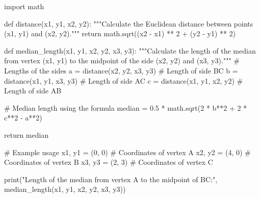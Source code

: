 import math

def distance(x1, y1, x2, y2):
    """Calculate the Euclidean distance between points (x1, y1) and (x2, y2)."""
    return math.sqrt((x2 - x1) ** 2 + (y2 - y1) ** 2)

def median_length(x1, y1, x2, y2, x3, y3):
    """Calculate the length of the median from vertex (x1, y1) to the midpoint of the side (x2, y2) and (x3, y3)."""
    # Lengths of the sides
    a = distance(x2, y2, x3, y3)  # Length of side BC
    b = distance(x1, y1, x3, y3)  # Length of side AC
    c = distance(x1, y1, x2, y2)  # Length of side AB
    
    # Median length using the formula
    median = 0.5 * math.sqrt(2 * b**2 + 2 * c**2 - a**2)
    
    return median

# Example usage
x1, y1 = (0, 0)   # Coordinates of vertex A
x2, y2 = (4, 0)   # Coordinates of vertex B
x3, y3 = (2, 3)   # Coordinates of vertex C

print("Length of the median from vertex A to the midpoint of BC:", median_length(x1, y1, x2, y2, x3, y3))

